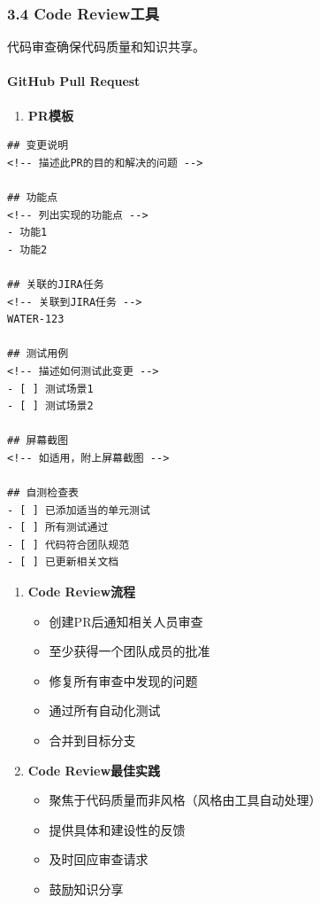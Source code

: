 \subsubsection{3.4 Code Review工具}\label{code-reviewux5de5ux5177}

代码审查确保代码质量和知识共享。

\paragraph{GitHub Pull Request}\label{github-pull-request}

\begin{enumerate}
\def\labelenumi{\arabic{enumi}.}
\tightlist
\item
  \textbf{PR模板}
\end{enumerate}

\begin{lstlisting}
## 变更说明
<!-- 描述此PR的目的和解决的问题 -->

## 功能点
<!-- 列出实现的功能点 -->
- 功能1
- 功能2

## 关联的JIRA任务
<!-- 关联到JIRA任务 -->
WATER-123

## 测试用例
<!-- 描述如何测试此变更 -->
- [ ] 测试场景1
- [ ] 测试场景2

## 屏幕截图
<!-- 如适用，附上屏幕截图 -->

## 自测检查表
- [ ] 已添加适当的单元测试
- [ ] 所有测试通过
- [ ] 代码符合团队规范
- [ ] 已更新相关文档
\end{lstlisting}

\begin{enumerate}
\def\labelenumi{\arabic{enumi}.}
\setcounter{enumi}{1}
\tightlist
\item
  \textbf{Code Review流程}

  \begin{itemize}
  \tightlist
  \item
    创建PR后通知相关人员审查
  \item
    至少获得一个团队成员的批准
  \item
    修复所有审查中发现的问题
  \item
    通过所有自动化测试
  \item
    合并到目标分支
  \end{itemize}
\item
  \textbf{Code Review最佳实践}

  \begin{itemize}
  \tightlist
  \item
    聚焦于代码质量而非风格（风格由工具自动处理）
  \item
    提供具体和建设性的反馈
  \item
    及时回应审查请求
  \item
    鼓励知识分享
  \end{itemize}
\end{enumerate}


